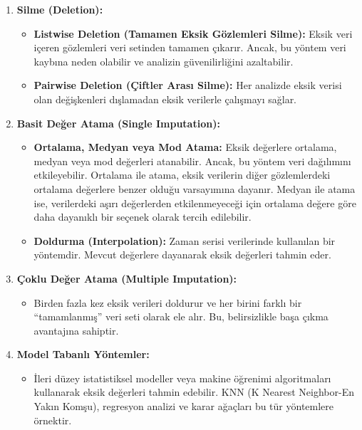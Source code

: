 \documentclass[
  letterpaper,
  DIV=11,
  numbers=noendperiod]{scrreprt}
\providecommand{\tightlist}{%
  \setlength{\itemsep}{0pt}\setlength{\parskip}{0pt}}\usepackage{longtable,booktabs,array}
\begin{document}
\begin{enumerate}
\def\labelenumi{\arabic{enumi}.}
\item
  \textbf{Silme (Deletion):}

  \begin{itemize}
  \item
    \textbf{Listwise Deletion (Tamamen Eksik Gözlemleri Silme):} Eksik
    veri içeren gözlemleri veri setinden tamamen çıkarır. Ancak, bu
    yöntem veri kaybına neden olabilir ve analizin güvenilirliğini
    azaltabilir.
  \item
    \textbf{Pairwise Deletion (Çiftler Arası Silme):} Her analizde eksik
    verisi olan değişkenleri dışlamadan eksik verilerle çalışmayı
    sağlar.
  \end{itemize}
\item
  \textbf{Basit Değer Atama (Single Imputation):}

  \begin{itemize}
  \item
    \textbf{Ortalama, Medyan veya Mod Atama:} Eksik değerlere ortalama,
    medyan veya mod değerleri atanabilir. Ancak, bu yöntem veri
    dağılımını etkileyebilir. Ortalama ile atama, eksik verilerin diğer
    gözlemlerdeki ortalama değerlere benzer olduğu varsayımına dayanır.
    Medyan ile atama ise, verilerdeki aşırı değerlerden etkilenmeyeceği
    için ortalama değere göre daha dayanıklı bir seçenek olarak tercih
    edilebilir.
  \item
    \textbf{Doldurma (Interpolation):} Zaman serisi verilerinde
    kullanılan bir yöntemdir. Mevcut değerlere dayanarak eksik değerleri
    tahmin eder.
  \end{itemize}
\item
  \textbf{Çoklu Değer Atama (Multiple Imputation):}

  \begin{itemize}
  \tightlist
  \item
    Birden fazla kez eksik verileri doldurur ve her birini farklı bir
    ``tamamlanmış'' veri seti olarak ele alır. Bu, belirsizlikle başa
    çıkma avantajına sahiptir.
  \end{itemize}
\item
  \textbf{Model Tabanlı Yöntemler:}

  \begin{itemize}
  \tightlist
  \item
    İleri düzey istatistiksel modeller veya makine öğrenimi
    algoritmaları kullanarak eksik değerleri tahmin edebilir. KNN (K
    Nearest Neighbor-En Yakın Komşu), regresyon analizi ve karar
    ağaçları bu tür yöntemlere örnektir.
  \end{itemize}
\end{enumerate}
\end{document}

